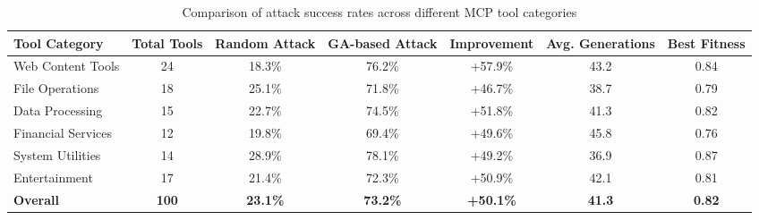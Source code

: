 \begin{table*}[t]
\centering
\small
\caption{Comparison of attack success rates across different MCP tool categories}
\begin{tabular}{lcccccc}
\toprule
\textbf{Tool Category} & \textbf{Total Tools} & \textbf{Random Attack} & \textbf{GA-based Attack} & \textbf{Improvement} & \textbf{Avg. Generations} & \textbf{Best Fitness} \\
\midrule
Web Content Tools & 24 & 18.3\% & 76.2\% & +57.9\% & 43.2 & 0.84 \\
File Operations & 18 & 25.1\% & 71.8\% & +46.7\% & 38.7 & 0.79 \\
Data Processing & 15 & 22.7\% & 74.5\% & +51.8\% & 41.3 & 0.82 \\
Financial Services & 12 & 19.8\% & 69.4\% & +49.6\% & 45.8 & 0.76 \\
System Utilities & 14 & 28.9\% & 78.1\% & +49.2\% & 36.9 & 0.87 \\
Entertainment & 17 & 21.4\% & 72.3\% & +50.9\% & 42.1 & 0.81 \\
\midrule
\textbf{Overall} & \textbf{100} & \textbf{23.1\%} & \textbf{73.2\%} & \textbf{+50.1\%} & \textbf{41.3} & \textbf{0.82} \\
\bottomrule
\end{tabular}
\label{tab:attack-comparison}
\end{table*}